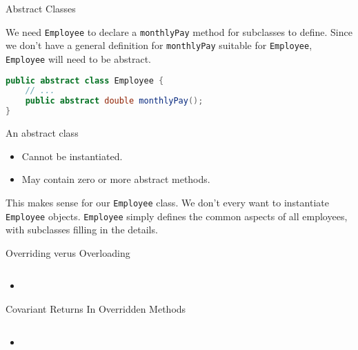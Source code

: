 \documentclass{beamer}
\begin{document}
\begin{frame}[fragile]{Abstract Classes}


We need {\tt Employee} to declare a {\tt monthlyPay} method for subclasses to define.  Since we don't have a general definition for {\tt monthlyPay} suitable for {\tt Employee}, {\tt Employee} will need to be abstract.
\begin{lstlisting}[language=Java]
public abstract class Employee {
    // ...
    public abstract double monthlyPay();
}
\end{lstlisting}
An abstract class
\begin{itemize}
\item Cannot be instantiated.
\item May contain zero or more abstract methods.
\end{itemize}

This makes sense for our {\tt Employee} class.  We don't every want to instantiate {\tt Employee} objects.  {\tt Employee} simply defines the common aspects of all employees, with subclasses filling in the details.

\end{frame}




\begin{frame}[fragile]{Overriding verus Overloading}


\begin{lstlisting}[language=Java]

\end{lstlisting}

\begin{itemize}
\item
\end{itemize}


\end{frame}


\begin{frame}[fragile]{Covariant Returns In Overridden Methods}


\begin{lstlisting}[language=Java]

\end{lstlisting}

\begin{itemize}
\item
\end{itemize}


\end{frame}
\end{document}
